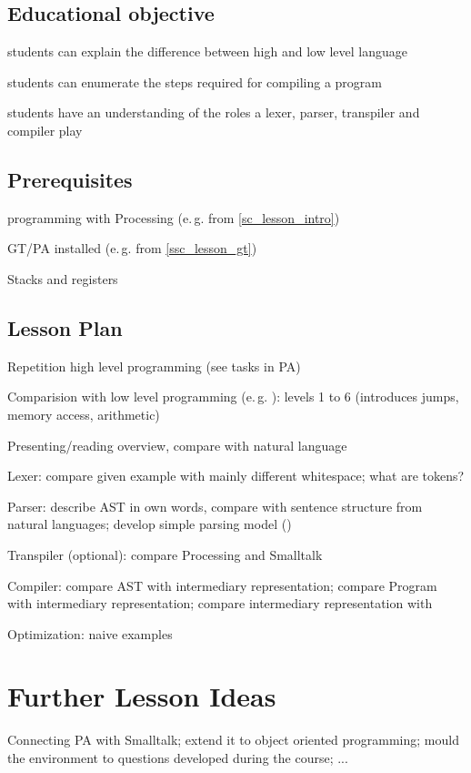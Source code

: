 \subsection{Educational objective}

\begin{todo}
\item students can explain the difference between high and low level language
\item students can enumerate the steps required for compiling a program
\item students have an understanding of the roles a lexer, parser, transpiler and compiler play
\end{todo}


\subsection{Prerequisites}

\begin{todo}
\item programming with Processing (e.\,g. from \ref{sc_lesson_intro})
\item GT/PA installed (e.\,g. from \ref{ssc_lesson_gt})
\item Stacks and registers
\end{todo}


\subsection{Lesson Plan}

\begin{todo}
\item Repetition high level programming (see tasks in PA)
\item Comparision with low level programming (e.\,g. \cite{Tom15}): levels 1 to 6 (introduces jumps, memory access, arithmetic)
\item Presenting/reading overview, compare with natural language
\item Lexer: compare given example with mainly different whitespace; what are tokens?
\item Parser: describe AST in own words, compare with sentence structure from natural languages; develop simple parsing model ()
\item Transpiler (optional): compare Processing and Smalltalk
\item Compiler: compare AST with intermediary representation; compare Program with intermediary representation; compare intermediary representation with \cite{Tom15}
\item Optimization: naive examples
\end{todo}



\section{Further Lesson Ideas} \label{sc_lesson_other}

Connecting PA with Smalltalk; extend it to object oriented programming; mould the environment to questions developed during the course; ...
